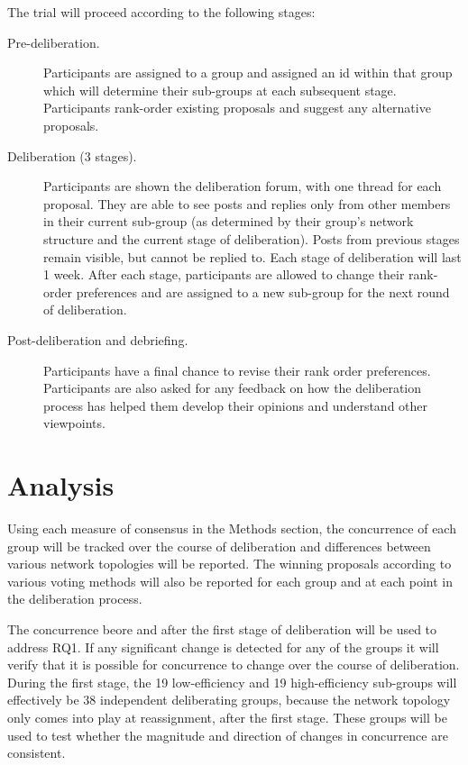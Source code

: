 The trial will proceed according to the following stages:
\begin{description}
\item[Pre-deliberation.]{Participants are assigned to a group and assigned an id within that group which will determine their sub-groups at each subsequent stage. Participants rank-order existing proposals and suggest any alternative proposals.}
\item[Deliberation (3 stages).]{Participants are shown the deliberation forum, with one thread for each proposal. They are able to see posts and replies only from other members in their current sub-group (as determined by their group’s network structure and the current stage of deliberation). Posts from previous stages remain visible, but cannot be replied to. Each stage of deliberation will last 1 week. After each stage, participants are allowed to change their rank-order preferences and are assigned to a new sub-group for the next round of deliberation.}
\item[Post-deliberation and debriefing.]{Participants have a final chance to revise their rank order preferences. Participants are also asked for any feedback on how the deliberation process has helped them develop their opinions and understand other viewpoints.}
\end{description}

\section{Analysis}
Using each measure of consensus in the Methods section, the concurrence of each group will be tracked over the course of deliberation and differences between various network topologies will be reported. The winning proposals according to various voting methods will also be reported for each group and at each point in the deliberation process.

The concurrence beore and after the first stage of deliberation will be used to address RQ1. If any significant change is detected for any of the groups it will verify that it is possible for concurrence to change over the course of deliberation. During the first stage, the 19 low-efficiency and 19 high-efficiency sub-groups will effectively be 38 independent deliberating groups, because the network topology only comes into play at reassignment, after the first stage. These groups will be used to test whether the magnitude and direction of changes in concurrence are consistent.

